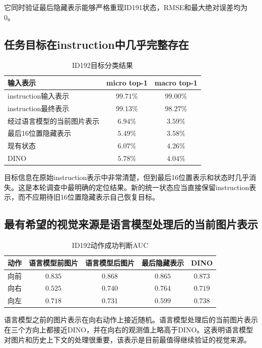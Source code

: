 \documentclass[UTF8,11pt,a4paper,fontset=none]{ctexart}
\newcommand{\good}[1]{\textcolor{NimlothGreen}{\textbf{#1}}}
\begin{document}
它同时验证最后隐藏表示能够严格重现ID191状态，RMSE和最大绝对误差均为0。

\subsection{任务目标在instruction中几乎完整存在}

\begin{table}[htbp]
\centering
\caption{ID192目标分类结果}
\small
\begin{tabular}{lcc}
\toprule
\textbf{输入表示} & \textbf{micro top-1} & \textbf{macro top-1} \\
\midrule
instruction输入表示 & \good{$99.71\%$} & \good{$99.00\%$} \\
instruction最终表示 & \good{$99.13\%$} & \good{$98.27\%$} \\
经过语言模型的当前图片表示 & $6.94\%$ & $3.59\%$ \\
最后16位置隐藏表示 & $5.49\%$ & $3.58\%$ \\
现有状态 & $6.07\%$ & $4.26\%$ \\
DINO & $5.78\%$ & $4.04\%$ \\
\bottomrule
\end{tabular}
\end{table}

目标信息在原始instruction表示中非常清楚，但到最后16位置表示和状态时几乎消失。这是本轮调查中最明确的定位结果。新的统一状态应当直接保留instruction表示，而不应期待旧16位置隐藏表示自己恢复目标。

\subsection{最有希望的视觉来源是语言模型处理后的当前图片表示}

\begin{table}[htbp]
\centering
\caption{ID192动作成功判断AUC}
\small
\begin{tabular}{lcccc}
\toprule
\textbf{动作} & \textbf{语言模型前图片} & \textbf{语言模型后图片} & \textbf{最后隐藏表示} & \textbf{DINO} \\
\midrule
向前 & $0.835$ & $0.868$ & $0.865$ & $0.873$ \\
向右 & $0.525$ & $0.740$ & $0.764$ & $0.719$ \\
向左 & $0.718$ & $0.731$ & $0.599$ & $0.738$ \\
\bottomrule
\end{tabular}
\end{table}

语言模型之前的图片表示在向右动作上接近随机。语言模型处理后的当前图片表示在三个方向上都接近DINO，并在向右的观测值上略高于DINO。这表明语言模型对图片和历史上下文的处理很重要，该表示是目前最值得继续验证的视觉来源。
\end{document}
